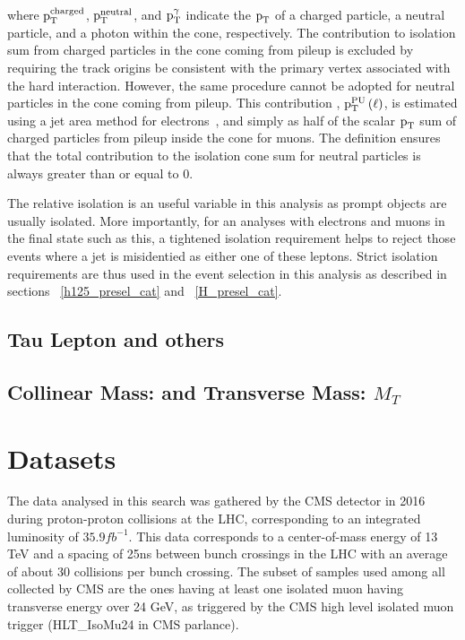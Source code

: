 where $\text{p}_\text{T}^\text{charged}$, $\text{p}_\text{T}^\text{neutral}$, and $\text{p}_\text{T}^{\gamma}$  indicate the $\text{p}_\text{T}$ of a charged particle, a neutral particle, and a photon within the cone, respectively. The contribution to isolation sum from charged particles in the cone coming from pileup is excluded by requiring the track origins be consistent with the primary vertex associated with the hard interaction. However, the same procedure cannot be adopted for neutral particles in the cone coming from pileup. This contribution , $\text{p}_\text{T}^\text{PU}\left(\ell\right)$, is estimated using a jet area method for electrons~\cite{isolation_1,isolation_2}, and simply as half of the scalar $\text{p}_\text{T}$ sum of charged particles from pileup inside the cone for muons. The definition ensures that the total contribution to the isolation cone sum for neutral particles is always greater than or equal to 0. 

The relative isolation is an useful variable in this analysis as prompt objects are usually isolated. More importantly, for an analyses with electrons and muons in the final state such as this, a tightened isolation requirement helps to reject those events where a jet is misidentied as either one of these leptons. Strict isolation requirements are thus used in the event selection in this analysis as described in sections ~\ref{h125_presel_cat} and ~\ref{H_presel_cat}.    


\subsection{Tau Lepton and others}
\label{tau_recon}




\subsection{Collinear Mass: \mcol and Transverse Mass: $M_{T}$}


\section{Datasets}
\label{datasets}

The data analysed in this search was gathered by the CMS detector in 2016 during proton-proton collisions at the LHC, corresponding to an integrated luminosity of $35.9 fb^{-1}$. This data corresponds to a center-of-mass energy of 13 TeV and a spacing of 25ns between bunch crossings in the LHC with an average of about 30 collisions per bunch crossing. The subset of samples used among all collected by CMS are the ones having at least one isolated muon having transverse energy over 24 GeV, as triggered by the CMS high level isolated muon trigger (HLT\_IsoMu24 in CMS parlance).




%
% 
% 

%
% 
% 
